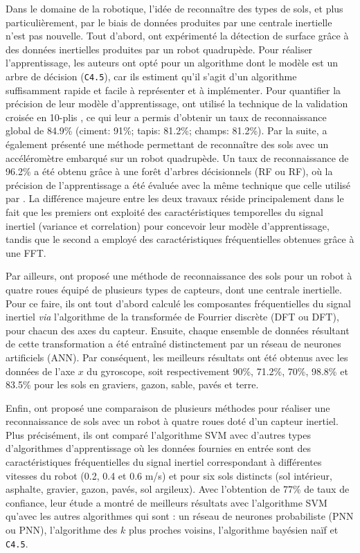 Dans le domaine de la robotique, l'idée de reconnaître des types de sols, et plus particulièrement, par le biais de données produites par une centrale inertielle n'est pas nouvelle. Tout d'abord, \cite{Vail2004} ont expérimenté la détection de surface grâce à des données inertielles produites par un robot quadrupède. Pour réaliser l'apprentissage, les auteurs ont opté pour un algorithme dont le modèle est un arbre de décision (\texttt{C4.5}), car ils estiment qu'il s'agit d'un algorithme suffisamment rapide et facile à représenter et à implémenter. Pour quantifier la précision de leur modèle d'apprentissage, \citeauthor{Vail2004} ont utilisé la technique de la validation croisée en 10-plis \citep{Kohavi1995}, ce qui leur a permis d'obtenir un taux de reconnaissance global de 84.9\% (ciment: 91\%; tapis: 81.2\%; champs: 81.2\%). Par la suite, \cite{Kertesz2016} a également présenté une méthode permettant de reconnaître des sols avec un accéléromètre embarqué sur un robot quadrupède. Un taux de reconnaissance de 96.2\% a été obtenu grâce à une forêt d'arbres décisionnels (\acl{RF} ou \acs{RF}), où la précision de l'apprentissage a été évaluée avec la même technique que celle utilisé par \citeauthor{Vail2004}. La différence majeure entre les deux travaux réside principalement dans le fait que les premiers ont exploité des caractéristiques temporelles du signal inertiel (variance et correlation) pour concevoir leur modèle d'apprentissage, tandis que le second a employé des caractéristiques fréquentielles obtenues grâce à une \acs{FFT}.

Par ailleurs, \cite{Bibuli2007} ont proposé une méthode de reconnaissance des sols pour un robot à quatre roues équipé de plusieurs types de capteurs, dont une centrale inertielle. Pour ce faire, ils ont tout d'abord calculé les composantes fréquentielles du signal inertiel \textit{via} l'algorithme de la transformée de Fourrier discrète (\acl{DFT} ou \acs{DFT}), pour chacun des axes du capteur. Ensuite, chaque ensemble de données résultant de cette transformation a été entraîné distinctement par un réseau de neurones artificiels (\acs{ANN}). Par conséquent, les meilleurs résultats ont été obtenus avec les données de l'axe $x$ du gyroscope, soit respectivement 90\%, 71.2\%, 70\%, 98.8\% et 83.5\% pour les sols en graviers, gazon, sable, pavés et terre.

Enfin, \cite{Weiss2007} ont proposé une comparaison de plusieurs méthodes pour réaliser une reconnaissance de sols avec un robot à quatre roues doté d'un capteur inertiel. Plus précisément, ils ont comparé l'algorithme \acs{SVM} avec d'autres types d'algorithmes d'apprentissage où les données fournies en entrée sont des caractéristiques fréquentielles du signal inertiel correspondant à différentes vitesses du robot (0.2, 0.4 et 0.6 m/s) et pour six sols distincts (sol intérieur, asphalte, gravier, gazon, pavés, sol argileux). Avec l'obtention de 77\% de taux de confiance, leur étude a montré de meilleurs résultats avec l'algorithme \acs{SVM} qu'avec les autres algorithmes qui sont : un réseau de neurones probabiliste (\acl{PNN} ou \acs{PNN}), l'algorithme des $k$ plus proches voisins, l'algorithme bayésien naïf et \texttt{C4.5}.

